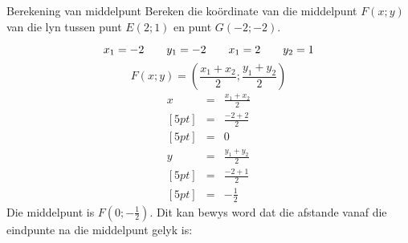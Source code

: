 \begin{wex}{Berekening van middelpunt}
 {Bereken die ko\"ordinate van die middelpunt $F(x;y)$ van die lyn tussen punt $E(2;1)$ en punt $G(-2;-2)$.}
{
\setcounter{subfigure}{0}
\vspace*{-20pt}
\begin{figure}[H] %
\begin{center}
\end{center}
\end{figure} 
\begin{equation*}
x_1 = -2 \hskip2em y_1 = -2 \hskip2em x_1 = 2 \hskip2em y_2 = 1
\end{equation*}
\begin{equation*}
F(x;y)=(\dfrac{{x}_{1} + {x}_{2}}{2};\dfrac{{y}_{1}+{y}_{2}}{2})
\end{equation*}
\begin{eqnarray*}
x & = & \frac{{x}_{1} + {x}_{2}}{2} \\ [5pt]
& = & \frac{-2 + 2}{2} \\ [5pt]
& = & 0 \\ 
y & = & \frac{{y}_{1} + {y}_{2}}{2} \\ [5pt]
& = & \frac{-2 + 1}{2} \\ [5pt]
& = & -\frac{1}{2} 
\end{eqnarray*}
Die middelpunt is $F(0;-\frac{1}{2})$.
Dit kan bewys word dat die afstande vanaf die eindpunte na die middelpunt gelyk is: 
}
\end{wex}
